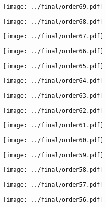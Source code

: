 \documentclass{article}
\begin{document}
\begin{figure}[H]
    \centering
    \texttt{[image: ../final/order69.pdf]}
\end{figure}
\begin{figure}[H]
    \centering
    \texttt{[image: ../final/order68.pdf]}
\end{figure}
\begin{figure}[H]
    \centering
    \texttt{[image: ../final/order67.pdf]}
\end{figure}
\begin{figure}[H]
    \centering
    \texttt{[image: ../final/order66.pdf]}
\end{figure}
\begin{figure}[H]
    \centering
    \texttt{[image: ../final/order65.pdf]}
\end{figure}
\begin{figure}[H]
    \centering
    \texttt{[image: ../final/order64.pdf]}
\end{figure}
\begin{figure}[H]
    \centering
    \texttt{[image: ../final/order63.pdf]}
\end{figure}
\begin{figure}[H]
    \centering
    \texttt{[image: ../final/order62.pdf]}
\end{figure}
\begin{figure}[H]
    \centering
    \texttt{[image: ../final/order61.pdf]}
\end{figure}
\begin{figure}[H]
    \centering
    \texttt{[image: ../final/order60.pdf]}
\end{figure}
\begin{figure}[H]
    \centering
    \texttt{[image: ../final/order59.pdf]}
\end{figure}
\begin{figure}[H]
    \centering
    \texttt{[image: ../final/order58.pdf]}
\end{figure}
\begin{figure}[H]
    \centering
    \texttt{[image: ../final/order57.pdf]}
\end{figure}
\begin{figure}[H]
    \centering
    \texttt{[image: ../final/order56.pdf]}
\end{figure}
\end{document}
